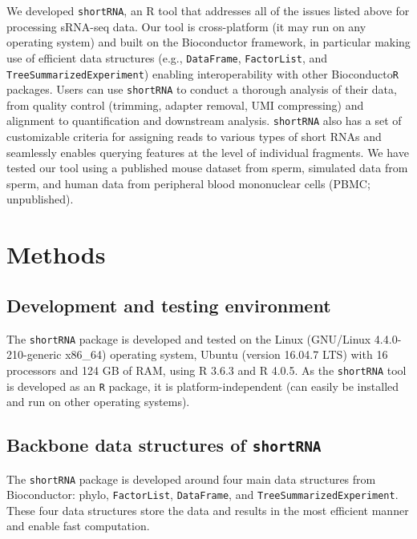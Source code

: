\documentclass[12pt,twoside]{reedthesis}
\begin{document}
We developed \texttt{shortRNA}, an R tool that addresses all of the issues listed
above for processing sRNA-seq data. Our tool is cross-platform (it may
run on any operating system) and built on the Bioconductor framework, in
particular making use of efficient data structures (e.g., \texttt{DataFrame},
\texttt{FactorList}, and \texttt{TreeSummarizedExperiment}) enabling interoperability with
other Bioconducto\texttt{R} packages. Users can use \texttt{shortRNA} to conduct a
thorough analysis of their data, from quality control (trimming, adapter
removal, UMI compressing) and alignment to quantification and downstream
analysis. \texttt{shortRNA} also has a set of customizable criteria for assigning
reads to various types of short RNAs and seamlessly enables querying
features at the level of individual fragments. We have tested our tool
using a published mouse dataset from sperm, simulated data from sperm,
and human data from peripheral blood mononuclear cells (PBMC;
unpublished).

\hypertarget{methods-2}{%
\section{Methods}\label{methods-2}}

\hypertarget{development-and-testing-environment}{%
\subsection{Development and testing environment}\label{development-and-testing-environment}}

The \texttt{shortRNA} package is developed and tested on the Linux (GNU/Linux
4.4.0-210-generic x86\_64) operating system, Ubuntu (version 16.04.7 LTS)
with 16 processors and 124 GB of RAM, using R 3.6.3 and R 4.0.5. As the
\texttt{shortRNA} tool is developed as an \texttt{R} package, it is platform-independent
(can easily be installed and run on other operating systems).

\hypertarget{backbone-data-structures-of-shortrna}{%
\subsection{\texorpdfstring{Backbone data structures of \texttt{shortRNA}}{Backbone data structures of shortRNA}}\label{backbone-data-structures-of-shortrna}}

The \texttt{shortRNA} package is developed around four main data structures from
Bioconductor: phylo, \texttt{FactorList}, \texttt{DataFrame}, and
\texttt{TreeSummarizedExperiment}. These four data structures store the data and
results in the most efficient manner and enable fast computation.
\end{document}
